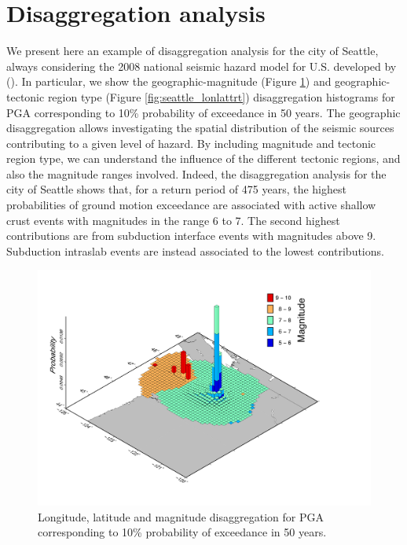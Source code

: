 \section{Disaggregation analysis}
We present here an example of disaggregation analysis for the city of Seattle, always considering the 2008
national seismic hazard model for U.S. developed by (\cite{petersen2008}). In particular, we show the geographic-magnitude (Figure \ref{fig:seattle_lonlatmag}) and geographic-tectonic region type (Figure \ref{fig:seattle_lonlattrt}) disaggregation histograms for PGA corresponding to 10\% probability of exceedance in 50 years. The geographic disaggregation allows investigating the spatial distribution of the
seismic sources contributing to a given level of hazard. By including magnitude and tectonic region type,
we can understand the influence of the different tectonic regions, and also the magnitude ranges involved.
Indeed, the disaggregation analysis for the city of Seattle shows that, for a return period of 475 years, the
highest probabilities of ground motion exceedance are associated with active shallow crust events with magnitudes in the range 6 to 7. The second highest contributions are from subduction interface events
with magnitudes above 9. Subduction intraslab events are instead associated to the lowest contributions.
\begin{figure}
\centering
\includegraphics[width=14cm]{./Pictures/Seattle_Lon_Lat_Mag.pdf}
\caption{Longitude, latitude and magnitude disaggregation for PGA corresponding to 10\% probability of exceedance in 50 years.}
\label{fig:seattle_lonlatmag}
\end{figure}


